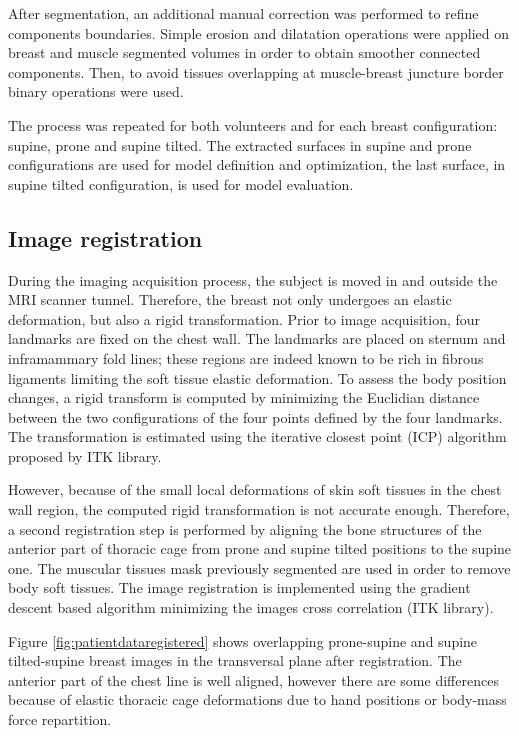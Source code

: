  After segmentation, an additional manual correction was performed to refine components boundaries. Simple erosion and dilatation operations were applied on breast and muscle segmented volumes in order to obtain smoother connected components. Then, to avoid tissues overlapping at muscle-breast juncture border binary operations were used.
 
The process was repeated for both volunteers and for each breast configuration: supine, prone and supine tilted. The extracted surfaces in supine and prone configurations are used for model definition and optimization,  the last surface, in supine tilted configuration, is used for model evaluation. 

\subsection{Image registration}\label{subsection:image registration}

During the imaging acquisition process, the subject is moved in and outside the MRI scanner tunnel. Therefore, the breast not only undergoes an elastic deformation, but also a rigid transformation. Prior to image acquisition, four landmarks are fixed on the chest wall.  The landmarks are placed on sternum and inframammary fold lines; these regions are indeed known to be rich in fibrous ligaments limiting the soft tissue elastic deformation.  To assess the body position changes, a rigid transform is computed by minimizing the Euclidian distance between the two configurations of the four points defined by the four landmarks. The transformation is estimated using the iterative closest point (ICP) algorithm proposed by ITK library.

However, because of the small local deformations of skin soft tissues in the chest wall region, the computed rigid transformation is not accurate enough. Therefore, a second registration step is performed by aligning the bone structures of the anterior part of thoracic cage from prone and supine tilted positions to the supine one. The muscular tissues mask previously segmented are used in order to remove body soft tissues. The image registration is implemented using the gradient descent based algorithm minimizing the images cross correlation (ITK library).

Figure \ref{fig:patientdataregistered} shows overlapping  prone-supine and supine tilted-supine breast images in the transversal plane after registration. The anterior part of the chest line is well aligned, however there are some differences because of elastic thoracic cage deformations due to hand positions or body-mass force repartition. 


